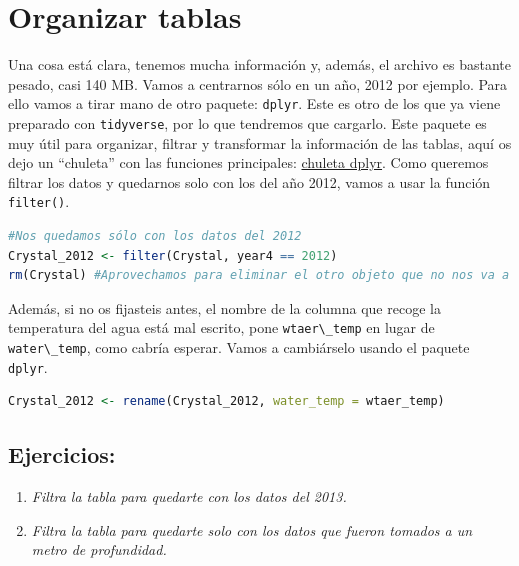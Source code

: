 \documentclass[
]{book}
\newcommand{\passthrough}[1]{#1}
\providecommand{\tightlist}{%
  \setlength{\itemsep}{0pt}\setlength{\parskip}{0pt}}
\begin{document}
\hypertarget{organizar-tablas}{%
\section{Organizar tablas}\label{organizar-tablas}}

Una cosa está clara, tenemos mucha información y, además, el archivo es bastante pesado, casi 140 MB. Vamos a centrarnos sólo en un año, 2012 por ejemplo. Para ello vamos a tirar mano de otro paquete: \passthrough{\lstinline!dplyr!}. Este es otro de los que ya viene preparado con \passthrough{\lstinline!tidyverse!}, por lo que tendremos que cargarlo. Este paquete es muy útil para organizar, filtrar y transformar la información de las tablas, aquí os dejo un ``chuleta'' con las funciones principales: \href{https://raw.githubusercontent.com/rstudio/cheatsheets/master/data-transformation.pdf}{chuleta dplyr}. Como queremos filtrar los datos y quedarnos solo con los del año 2012, vamos a usar la función \passthrough{\lstinline!filter()!}.

\begin{lstlisting}[language=R]
#Nos quedamos sólo con los datos del 2012
Crystal_2012 <- filter(Crystal, year4 == 2012)
rm(Crystal) #Aprovechamos para eliminar el otro objeto que no nos va a servir.
\end{lstlisting}

Además, si no os fijasteis antes, el nombre de la columna que recoge la temperatura del agua está mal escrito, pone \passthrough{\lstinline!wtaer\_temp!} en lugar de \passthrough{\lstinline!water\_temp!}, como cabría esperar. Vamos a cambiárselo usando el paquete \passthrough{\lstinline!dplyr!}.

\begin{lstlisting}[language=R]
Crystal_2012 <- rename(Crystal_2012, water_temp = wtaer_temp)
\end{lstlisting}

\hypertarget{ejercicios-1}{%
\subsection{Ejercicios:}\label{ejercicios-1}}

\begin{enumerate}
\def\labelenumi{\arabic{enumi}.}
\tightlist
\item
  \emph{Filtra la tabla para quedarte con los datos del 2013.}
\item
  \emph{Filtra la tabla para quedarte solo con los datos que fueron tomados a un metro de profundidad.}
\end{enumerate}
\end{document}
